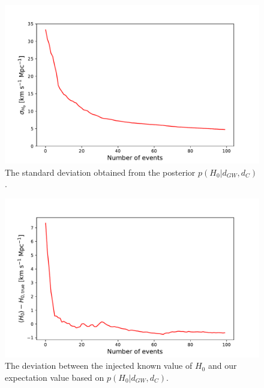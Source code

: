 \begin{figure}
    \centering
    \includegraphics[width=\columnwidth]{figures/std.pdf}
    \caption{The standard deviation obtained from the posterior $p(H_0 | d_{GW}, d_C)$.}
    \label{fig:std}
\end{figure}

\begin{figure}
    \centering
    \includegraphics[width=\columnwidth]{figures/diff.pdf}
    \caption{The deviation between the injected known value of $H_0$ and our expectation value based on $p(H_0 | d_{GW}, d_C)$.}
    \label{fig:mean_diff}
\end{figure}

